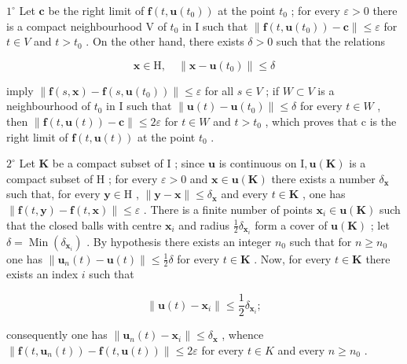 \(1^{\circ}\) Let \(\mathbf{c}\) be the right limit of \(\mathbf{f}(t, \mathbf{u}(t_0))\) at the point \(t_0\) ; for every \(\varepsilon > 0\) there is a compact neighbourhood V of \(t_0\) in I such that \(\| \mathbf{f}(t, \mathbf{u}(t_0)) - \mathbf{c} \| \leqslant \varepsilon\) for \(t \in V\) and \(t > t_0\) . On the other hand, there exists \(\delta > 0\) such that the relations

\[
\mathbf {x} \in \mathrm{H}, \quad \| \mathbf {x} - \mathbf {u} (t _ {0}) \| \leqslant \delta
\]

imply \(\|\mathbf{f}(s,\mathbf{x})-\mathbf{f}(s,\mathbf{u}(t_{0}))\|\leqslant\varepsilon\) for all \(s\in V\) ; if \(W\subset V\) is a neighbourhood of \(t_{0}\) in I such that \(\|\mathbf{u}(t)-\mathbf{u}(t_{0})\|\leqslant\delta\) for every \(t\in W\) , then \(\|\mathbf{f}(t,\mathbf{u}(t))-\mathbf{c}\|\leqslant2\varepsilon\) for \(t\in W\) and \(t>t_{0}\) , which proves that c is the right limit of \(\mathbf{f}(t,\mathbf{u}(t))\) at the point \(t_{0}\) .

\(2^{\circ}\) Let \(\mathbf{K}\) be a compact subset of \(\mathrm{I}\) ; since \(\mathbf{u}\) is continuous on \(\mathrm{I}, \mathbf{u}(\mathbf{K})\) is a compact subset of \(\mathrm{H}\) ; for every \(\varepsilon > 0\) and \(\mathbf{x} \in \mathbf{u}(\mathbf{K})\) there exists a number \(\delta_{\mathbf{x}}\) such that, for every \(\mathbf{y} \in \mathrm{H}\) , \(\| \mathbf{y} - \mathbf{x} \| \leqslant \delta_{\mathbf{x}}\) and every \(t \in \mathbf{K}\) , one has \(\| \mathbf{f}(t, \mathbf{y}) - \mathbf{f}(t, \mathbf{x}) \| \leqslant \varepsilon\) . There is a finite number of points \(\mathbf{x}_i \in \mathbf{u}(\mathbf{K})\) such that the closed balls with centre \(\mathbf{x}_i\) and radius \(\frac{1}{2} \delta_{\mathbf{x}_i}\) form a cover of \(\mathbf{u}(\mathbf{K})\) ; let \(\delta = \operatorname{Min}\left(\delta_{\mathbf{x}_i}\right)\) . By hypothesis there exists an integer \(n_0\) such that for \(n \geqslant n_0\) one has \(\| \mathbf{u}_n(t) - \mathbf{u}(t) \| \leqslant \frac{1}{2} \delta\) for every \(t \in \mathbf{K}\) . Now, for every \(t \in \mathbf{K}\) there exists an index \(i\) such that

\[
\left\| \mathbf {u} (t) - \mathbf {x} _ {i} \right\| \leqslant \frac {1}{2} \delta_ {\mathbf {x} _ {i}};
\]

consequently one has \(\|\mathbf{u}_{n}(t)-\mathbf{x}_{i}\|\leqslant\delta_{\mathbf{x}}\) , whence \(\|\mathbf{f}(t,\mathbf{u}_{n}(t))-\mathbf{f}(t,\mathbf{u}(t))\|\leqslant2\varepsilon\) for every \(t\in K\) and every \(n\geqslant n_{0}\) .

